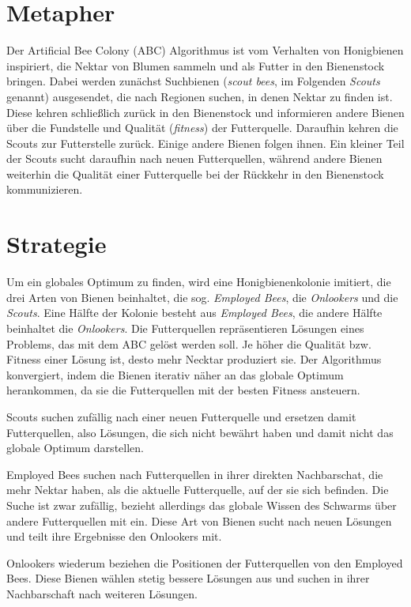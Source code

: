 
\section{Metapher}

Der Artificial Bee Colony (ABC) Algorithmus ist vom Verhalten von Honigbienen
inspiriert, die Nektar von Blumen sammeln und als Futter in den Bienenstock
bringen. Dabei werden zunächst Suchbienen (\emph{scout bees}, im Folgenden
\emph{Scouts} genannt) ausgesendet, die nach Regionen suchen, in denen Nektar
zu finden ist. Diese kehren schließlich zurück in den Bienenstock und
informieren andere Bienen über die Fundstelle und Qualität (\emph{fitness})
der Futterquelle.
Daraufhin kehren die Scouts zur Futterstelle zurück. Einige andere Bienen
folgen ihnen. Ein kleiner Teil der Scouts sucht daraufhin nach neuen
Futterquellen, während andere Bienen weiterhin die Qualität einer
Futterquelle bei der Rückkehr in den Bienenstock kommunizieren.

\section{Strategie}

Um ein globales Optimum zu finden, wird eine Honigbienenkolonie imitiert, die
drei Arten von Bienen beinhaltet, die sog. \emph{Employed Bees}, die
\emph{Onlookers} und die \emph{Scouts}. Eine Hälfte der Kolonie besteht aus
\emph{Employed Bees}, die andere Hälfte beinhaltet die \emph{Onlookers}.
Die Futterquellen repräsentieren Lösungen eines Problems, das mit dem ABC
gelöst werden soll. Je höher die Qualität bzw. Fitness einer Lösung ist, desto
mehr Necktar produziert sie. Der Algorithmus konvergiert, indem die Bienen
iterativ näher an das globale Optimum herankommen, da sie die Futterquellen mit
der besten Fitness ansteuern.

Scouts suchen zufällig nach einer neuen Futterquelle und ersetzen damit
Futterquellen, also Lösungen, die sich nicht bewährt haben und damit nicht das
globale Optimum darstellen.

Employed Bees suchen nach Futterquellen in ihrer direkten Nachbarschat, die
mehr Nektar haben, als die aktuelle Futterquelle, auf der sie sich befinden.
Die Suche ist zwar zufällig, bezieht allerdings das globale Wissen des
Schwarms über andere Futterquellen mit ein. Diese Art von Bienen sucht nach
neuen Lösungen und teilt ihre Ergebnisse den Onlookers mit.

Onlookers wiederum beziehen die Positionen der Futterquellen von den
Employed Bees. Diese Bienen wählen stetig bessere Lösungen aus und suchen in
ihrer Nachbarschaft nach weiteren Lösungen.

